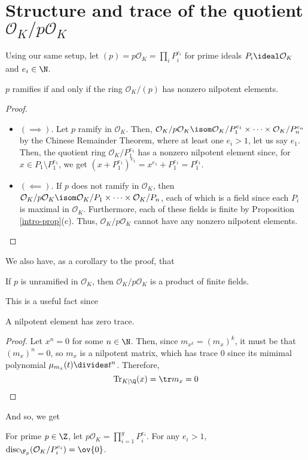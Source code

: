 \documentclass[11pt,leqno,oneside]{amsart}
\numberwithin{thm}{section}
\renewcommand{\O}{\mathcal{O}}
\newcommand{\disc}{\operatorname{disc}}
\newcommand{\Tr}{\operatorname{Tr}}
\begin{document}
\section{Structure and trace of the quotient \(\O_K/p\O_K\)}
Using our same setup, let \((p) = p\O_K = \prod_i P_i^{e_i}\) for
prime ideals \(P_i \ideal \O_K\) and \(e_i \in \N\). 
\begin{lem}\label{p-ramifies-iff-nilp}
  \(p\) ramifies if and only if the ring \(\O_K/(p)\) has nonzero
  nilpotent elements.
\end{lem}
\begin{proof}
  \begin{itemize}
    \item \((\implies)\). Let \(p\) ramify in \(\O_K\). Then, \(\O_K/p\O_K
      \isom \O_K/P_1^{e_1}\times \cdots \times \O_K/P_n^{e_n}\) by the
      Chinese Remainder Theorem, where at
      least one \(e_i > 1\), let us say \(e_1\). Then, the quotient
      ring \(\O_K/P_1^{e_1}\) has a nonzero nilpotent element since,
      for \(x \in 
      P_1 \setminus P_1^{e_1}\), we get \((x+P_1^{e_1})^{e_1} =
      x^{e_1} + P_1^{e_1} = P_1^{e_1}\).
    \item \((\impliedby)\). If \(p\) does not ramify in \(\O_K\), then
      \(\O_K/p\O_K \isom \O_K/P_1 \times \cdots \times \O_K/P_n\), each of which
      is a field since each \(P_i\) is maximal in
      \(\O_K\). Furthermore, each of these fields is finite by
      Proposition \ref{intro-prop}(c). Thus,
      \(\O_K/p\O_K\) cannot have any nonzero nilpotent elements. 
    \end{itemize}
  \end{proof}
We also have, as a corollary to the proof, that
\begin{cor}\label{unramified-gives-prod-of-finite-fields}
  If \(p\) is unramified in \(\O_K\), then \(\O_K/p\O_K\) is a product of
  finite fields. 
\end{cor}
This is a useful fact since
\begin{lem}\label{nilp-elt-has-zero-trace}
  A nilpotent element has zero trace.
\end{lem}
\begin{proof}
  Let \(x^n = 0\) for some \(n \in \N\). Then, since \(m_{x^k} =
  (m_x)^k\), it must be that \((m_x)^n = 0\), so \(m_x\) is a
  nilpotent matrix, which has trace \(0\) since its mimimal
  polynomial \(\mu_{m_x}(t) \divides t^n\). Therefore, \[
    \Tr_{K|\Q}(x) = \tr m_{x} = 0
  \]
\end{proof}
And so, we get
\begin{lem}\label{nilp-elt-gives-disc-zero-mod-p}
  For prime \(p \in \Z\), let \(p\O_K = \prod_{i=1}^g
  P_i^{e_i}\). For any \(e_i > 1\),
  \(\disc_{\F_p}(\O_K/P_i^{e_i}) = \ov{0}\).
\end{lem}
\end{document}
